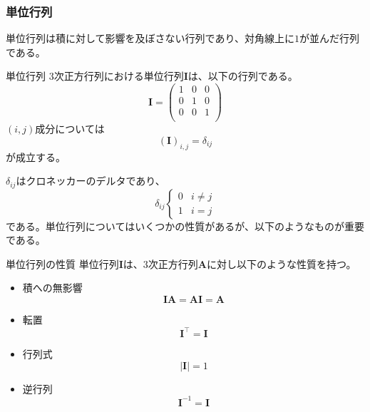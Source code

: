 \subsubsection{単位行列}
単位行列は積に対して影響を及ぼさない行列であり、対角線上に\(1\)が並んだ行列である。
\begin{definition*}{単位行列}
	3次正方行列における単位行列\(\boldsymbol{I}\)は、以下の行列である。
	\begin{equation}
		\boldsymbol{I}=
		\begin{pmatrix}
			1 & 0 & 0 \\
			0 & 1 & 0 \\
			0 & 0 & 1 \\
		\end{pmatrix}
	\end{equation}
	\((i,j)\)成分については
	\begin{equation}
		(\boldsymbol{I})_{i,j}=\delta_{ij}
	\end{equation}
	が成立する。
\end{definition*}
\(\delta_{ij}\)はクロネッカーのデルタであり、
\begin{equation}
	\delta_{ij}
	\begin{cases}
		0 & i\neq j \\
		1 & i = j
	\end{cases}
\end{equation}
である。単位行列についてはいくつかの性質があるが、以下のようなものが重要である。
\begin{theorem*}{単位行列の性質}
	単位行列\(\boldsymbol{I}\)は、3次正方行列\(\boldsymbol{A}\)に対し以下のような性質を持つ。
	\begin{itemize}
		\item 積への無影響
		      \begin{equation}
			      \boldsymbol{I}\boldsymbol{A}=\boldsymbol{A}\boldsymbol{I}=\boldsymbol{A}
		      \end{equation}
		\item 転置
		      \begin{equation}
			      \boldsymbol{I}^{\top}=\boldsymbol{I}
		      \end{equation}
		\item 行列式
		      \begin{equation}
			      |\boldsymbol{I}|=1
		      \end{equation}
		\item 逆行列
		      \begin{equation}
			      \boldsymbol{I}^{-1}=\boldsymbol{I}
		      \end{equation}
	\end{itemize}
\end{theorem*}
